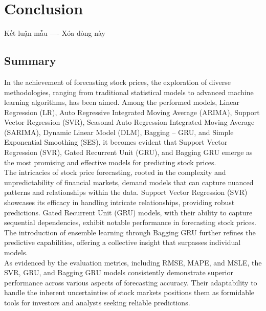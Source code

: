 \documentclass{ieeeojies}
\begin{document}
\section{Conclusion}
Kết luận mẫu ---- Xóa dòng này
\subsection{Summary}
In the achievement of forecasting stock prices, the exploration of diverse methodologies, ranging from traditional statistical models to advanced machine learning algorithms, has been aimed. Among the performed models, Linear Regression (LR), Auto Regressive Integrated Moving Average (ARIMA), Support Vector Regression (SVR), Seasonal Auto Regression Integrated Moving Average (SARIMA), Dynamic Linear Model (DLM), Bagging – GRU, and Simple Exponential Smoothing (SES), it becomes evident that Support Vector Regression (SVR), Gated Recurrent Unit (GRU), and Bagging GRU emerge as the most promising and effective models for predicting stock prices.\\
The intricacies of stock price forecasting, rooted in the complexity and unpredictability of financial markets, demand models that can capture nuanced patterns and relationships within the data. Support Vector Regression (SVR) showcases its efficacy in handling intricate relationships, providing robust predictions. Gated Recurrent Unit (GRU) models, with their ability to capture sequential dependencies, exhibit notable performance in forecasting stock prices. The introduction of ensemble learning through Bagging GRU further refines the predictive capabilities, offering a collective insight that surpasses individual models.\\
As evidenced by the evaluation metrics, including RMSE, MAPE, and MSLE, the SVR, GRU, and Bagging GRU models consistently demonstrate superior performance across various aspects of forecasting accuracy. Their adaptability to handle the inherent uncertainties of stock markets positions them as formidable tools for investors and analysts seeking reliable predictions.
\end{document}
